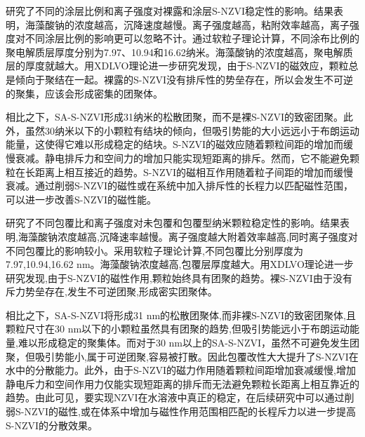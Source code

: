 
研究了不同的涂层比例和离子强度对裸露和涂层S-NZVI稳定性的影响。结果表明，海藻酸钠的浓度越高，沉降速度越慢。离子强度越高，粘附效率越高，离子强度对不同涂层比例的影响更可以忽略不计。通过软粒子理论计算，不同涂布比例的聚电解质层厚度分别为7.97、10.94和16.62纳米。海藻酸钠的浓度越高，聚电解质层的厚度就越大。用XDLVO理论进一步研究发现，由于S-NZVI的磁效应，颗粒总是倾向于聚结在一起。裸露的S-NZVI没有排斥性的势垒存在，所以会发生不可逆的聚集，应该会形成密集的团聚体。

相比之下，SA-S-NZVI形成31纳米的松散团聚，而不是裸S-NZVI的致密团聚。此外，虽然30纳米以下的小颗粒有结块的倾向，但吸引势能的大小远远小于布朗运动能量，这使得它难以形成稳定的结块。S-NZVI的磁效应随着颗粒间距的增加而缓慢衰减。静电排斥力和空间力的增加只能实现短距离的排斥。然而，它不能避免颗粒在长距离上相互接近的趋势。S-NZVI的磁相互作用随着粒子间距的增加而缓慢衰减。通过削弱S-NZVI的磁性或在系统中加入排斥性的长程力以匹配磁性范围，可以进一步改善S-NZVI的磁性能。

研究了不同包覆比和离子强度对未包覆和包覆型纳米颗粒稳定性的影响。结果表明,海藻酸钠浓度越高,沉降速率越慢。离子强度越大附着效率越高,同时离子强度对不同包覆比的影响较小。采用软粒子理论计算,不同包覆比分别厚度为7.97,10.94,16.62 nm。海藻酸钠浓度越高,包覆层厚度越大。用XDLVO理论进一步研究发现,由于S-NZVI的磁性作用,颗粒始终具有团聚的趋势。裸S-NZVI由于没有斥力势垒存在,发生不可逆团聚,形成密实团聚体。

相比之下，SA-S-NZVI将形成31 nm的松散团聚体,而非裸S-NZVI的致密团聚体,且颗粒尺寸在30 nm以下的小颗粒虽然具有团聚的趋势,但吸引势能远小于布朗运动能量,难以形成稳定的聚集体。而对于30 nm以上的SA-S-NZVI，虽然不可避免发生团聚，但吸引势能小,属于可逆团聚,容易被打散。因此包覆改性大大提升了S-NZVI在水中的分散能力。此外，由于S-NZVI的磁力作用随着颗粒间距增加衰减缓慢,增加静电斥力和空间作用力仅能实现短距离的排斥而无法避免颗粒长距离上相互靠近的趋势。由此可见，要实现NZVI在水溶液中真正的稳定，在后续研究中可以通过削弱S-NZVI的磁性,或在体系中增加与磁性作用范围相匹配的长程斥力以进一步提高S-NZVI的分散效果。
